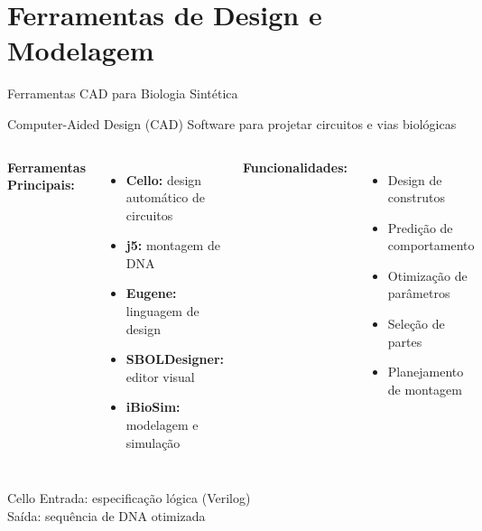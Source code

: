 \section{Ferramentas de Design e Modelagem}

\begin{frame}{Ferramentas CAD para Biologia Sintética}
\begin{block}{Computer-Aided Design (CAD)}
Software para projetar circuitos e vias biológicas
\end{block}

\vspace{0.3cm}

\begin{columns}
\textbf{Ferramentas Principais:}
\begin{itemize}
    \item \textbf{Cello:} design automático de circuitos
    \item \textbf{j5:} montagem de DNA
    \item \textbf{Eugene:} linguagem de design
    \item \textbf{SBOLDesigner:} editor visual
    \item \textbf{iBioSim:} modelagem e simulação
\end{itemize}

\textbf{Funcionalidades:}
\begin{itemize}
    \item Design de construtos
    \item Predição de comportamento
    \item Otimização de parâmetros
    \item Seleção de partes
    \item Planejamento de montagem
\end{itemize}
\end{columns}

\vspace{0.3cm}

\begin{exampleblock}{Cello}
Entrada: especificação lógica (Verilog)\\
Saída: sequência de DNA otimizada
\end{exampleblock}
\end{frame}

